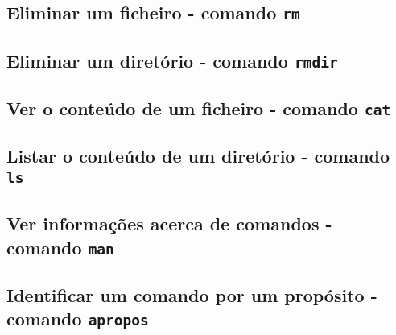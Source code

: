 \documentclass[a4paper, onecolumn, 10pt]{report}
\begin{document}
\subsection{Eliminar um ficheiro - comando \texttt{rm}}

\subsection{Eliminar um diretório - comando \texttt{rmdir}}

\subsection{Ver o conteúdo de um ficheiro - comando \texttt{cat}}

\subsection{Listar o conteúdo de um diretório - comando \texttt{ls}}

\subsection{Ver informações acerca de comandos - comando \texttt{man}}

\subsection{Identificar um comando por um propósito - comando \texttt{apropos}}

\tableofcontents

\newpage

\printacronyms[include-classes=abbrev, name=Acrónimos]
\end{document}
